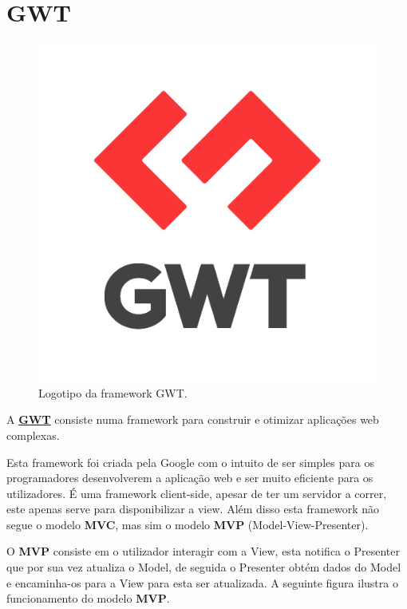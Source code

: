 \section{GWT}
\label{subsec:gwt}

\begin{figure}[H]
    \centering
    \includegraphics[scale=0.15]{images/gwt.png}
    \caption{Logotipo da framework GWT.}
    \label{fig:gwt}
\end{figure}

\hspace{5mm} A \href{http://www.gwtproject.org/}{\textbf{GWT}} consiste numa framework para construir e otimizar aplicações web complexas.

\hspace{5mm} Esta framework foi criada pela Google com o intuito de ser simples para os programadores desenvolverem a aplicação web e ser muito eficiente para os utilizadores. É uma framework client-side, apesar de ter um servidor a correr, este apenas serve para disponibilizar a view. Além disso esta framework não segue o modelo \textbf{MVC}, mas sim o modelo \textbf{MVP} (Model-View-Presenter).

\hspace{5mm} O \textbf{MVP} consiste em o utilizador interagir com a View, esta notifica o Presenter que por sua vez atualiza o Model, de seguida o Presenter obtém dados do Model e encaminha-os para a View para esta ser atualizada. A seguinte figura ilustra o funcionamento do modelo \textbf{MVP}.

